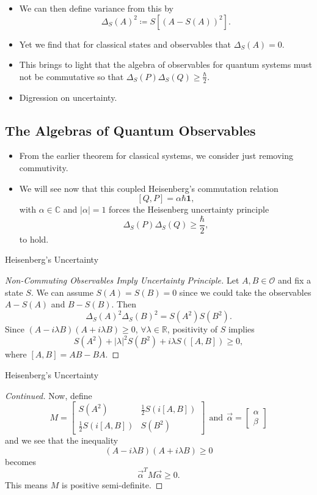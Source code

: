 \documentclass[pdf]{beamer}
\theoremstyle{definition}
\theoremstyle{theorem}
\newcommand{\R}{\mathbb{R}}
\newcommand{\C}{\mathbb{C}}
\newcommand{\opO}{\mathcal{O}}
\begin{document}
	\begin{frame}
	\begin{itemize}
	\item We can then define variance from this by
	\[
	\Delta_S(A)^2\coloneqq S[(A-S(A))^2].
	\]
	\item Yet we find that for classical states and observables that $\Delta_S(A)=0$.  
	\item This brings to light that the algebra of observables for quantum systems must not be commutative so that $\Delta_S(P)\Delta_S(Q)\geq \frac{\hbar}{2}$.
	\item Digression on uncertainty.
	\end{itemize}
	\end{frame}
	
\subsection{The Algebras of Quantum Observables}
	\begin{frame}
	\begin{itemize}
	\item From the earlier theorem for classical systems, we consider just removing commutivity.  
	\item We will see now that this coupled Heisenberg's commutation relation
	\[
	[Q,P]=\alpha \hbar \mathbf{1},
	\]
	with $\alpha\in \C$ and $|\alpha|=1$ forces the Heisenberg uncertainty principle \[
	\Delta_S(P)\Delta_S(Q)\geq \frac{\hbar}{2},
	\]
	to hold.
	\end{itemize}
	\end{frame}
	
	\begin{frame}{Heisenberg's Uncertainty}
	\begin{proof}[Non-Commuting Observables Imply Uncertainty Principle]\renewcommand{\qedsymbol}{}
	Let $A,B\in \opO$ and fix a state $S$.  We can assume $S(A)=S(B)=0$ since we could take the observables $A-S(A)$ and $B-S(B)$. Then 
	\[
	\Delta_S(A)^2\Delta_S(B)^2=S(A^2)S(B^2).
	\]
	Since $(A-i\lambda B)(A+i\lambda B)\geq 0$, $\forall \lambda \in \R$, positivity of $S$ implies
	\[
	S(A^2)+|\lambda|^2 S(B^2)+i\lambda S([A,B])\geq 0,
	\]
	where $[A,B]=AB-BA$. 
	\end{proof}
	\end{frame}
	
	\begin{frame}{Heisenberg's Uncertainty}
	\begin{proof}[Continued]\renewcommand{\qedsymbol}{}
	Now, define 
	\[
	M=\begin{bmatrix}
	S(A^2) & \frac{1}{2} S(i[A,B])\\
	\frac{1}{2} S(i[A,B]) & S(B^2)
	\end{bmatrix}
	~~ \textrm{and} ~~ \vec{\alpha}=\begin{bmatrix}
	\alpha\\
	\beta
	\end{bmatrix}
	\]
	and we see that the inequality
	\[
	(A-i\lambda B)(A+i\lambda B)\geq 0
	\]
	becomes 
	\[
	\vec{\alpha}^T M \vec{\alpha}\geq 0.
	\]
	This means $M$ is positive semi-definite.
	\end{proof}
	\end{frame}
	
\end{document}
